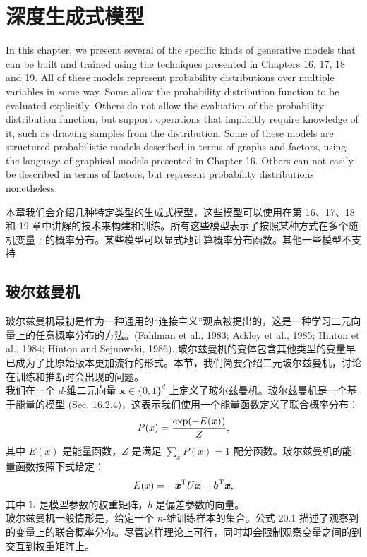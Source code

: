 \chapter{深度生成式模型}
\label{ch:generative_models}

In this chapter, we present several of the specific kinds of generative models that can be built and trained using the techniques presented in Chapters 16, 17, 18 and 19. All of these models represent probability distributions over multiple variables in some way. Some allow the probability distribution function to be evaluated explicitly. Others do not allow the evaluation of the probability distribution function, but support operations that implicitly require knowledge of it, such as drawing samples from the distribution. Some of these models are structured probabilistic models described in terms of graphs and factors, using the language of graphical models presented in Chapter 16. Others can not easily be described in terms of factors, but represent probability distributions nonetheless.

本章我们会介绍几种特定类型的生成式模型，这些模型可以使用在第 16、17、18 和 19 章中讲解的技术来构建和训练。所有这些模型表示了按照某种方式在多个随机变量上的概率分布。某些模型可以显式地计算概率分布函数。其他一些模型不支持


\section{玻尔兹曼机}
玻尔兹曼机最初是作为一种通用的“连接主义”观点被提出的，这是一种学习二元向量上的任意概率分布的方法。(Fahlman et al., 1983; Ackley et al., 1985; Hinton et al., 1984; Hinton and Sejnowski, 1986). 玻尔兹曼机的变体包含其他类型的变量早已成为了比原始版本更加流行的形式。本节，我们简要介绍二元玻尔兹曼机，讨论在训练和推断时会出现的问题。\\

我们在一个 $d$-维二元向量 $\mathbf{x} \in \{0,1\}^d$ 上定义了玻尔兹曼机。玻尔兹曼机是一个基于能量的模型 (Sec. 16.2.4)，这表示我们使用一个能量函数定义了联合概率分布：
$$P(x) = \frac{\exp(-E( \textbf{\emph{x}}))}{Z},$$
其中 $E(x)$ 是能量函数，$Z$ 是满足 $\sum_x P(x) = 1$ 配分函数。玻尔兹曼机的能量函数按照下式给定：
$$E(x) = - \textbf{\emph{x}}^\mathrm{ T } U  \textbf{\emph{x}}  -  \textbf{\emph{b}}^\mathrm{ T }  \textbf{\emph{x}},$$
其中 $\mathbb{U}$ 是模型参数的权重矩阵，$b$ 是偏差参数的向量。\\
玻尔兹曼机一般情形是，给定一个 $n$-维训练样本的集合。公式 20.1 描述了观察到的变量上的联合概率分布。尽管这样理论上可行，同时却会限制观察变量之间的到交互到权重矩阵上。

























